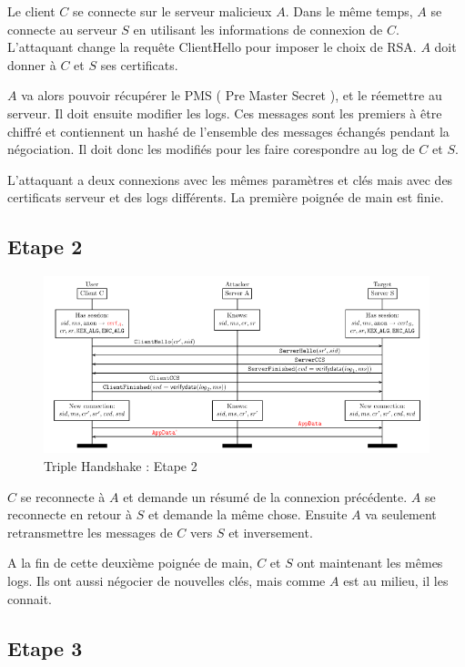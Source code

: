 Le client $C$ se connecte sur le serveur malicieux $A$. Dans le même temps, $A$ se connecte au serveur $S$ en utilisant
les informations de connexion de $C$. L'attaquant change la requête ClientHello pour imposer le choix de RSA. $A$
doit donner à $C$ et $S$ ses certificats.

$A$ va alors pouvoir récupérer le PMS ( Pre Master Secret ), et le réemettre au serveur. Il doit ensuite modifier
les logs. Ces messages sont les premiers à être chiffré et contiennent un hashé de l'ensemble 
des messages échangés pendant la négociation. Il doit donc les modifiés pour les faire corespondre au log de $C$ et $S$.

L'attaquant a deux connexions avec les mêmes paramètres et clés mais avec des certificats serveur et des logs 
différents. La première poignée de main est finie.

\subsection{Etape 2}
\label{sec:e2}

\begin{figure}[h]
\label{fig:hand2}
\centering
\includegraphics[scale=0.5]{Hand2}
\caption{Triple Handshake : Etape 2}
\end{figure}

$C$ se reconnecte à $A$ et demande un résumé de la connexion précédente. $A$ se reconnecte en retour à $S$ et demande la même chose.
Ensuite $A$ va seulement retransmettre les messages de $C$ vers $S$ et inversement.

A la fin de cette deuxième poignée de main, $C$ et $S$ ont maintenant les mêmes logs. Ils ont aussi négocier de
nouvelles clés, mais comme $A$ est au milieu, il les connait. 
\pagebreak

\subsection{Etape 3}
\label{sec:e3}

